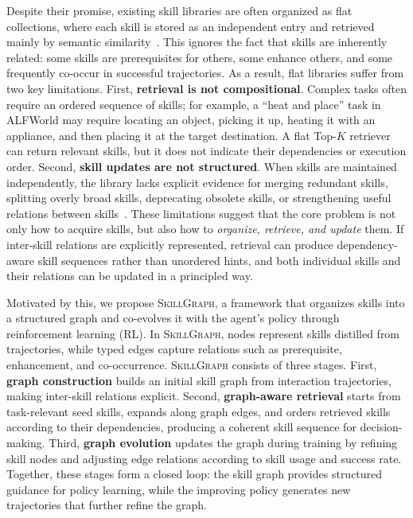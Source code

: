 Despite their promise, existing skill libraries are often organized as flat collections, where each skill is stored as an independent entry and retrieved mainly by semantic similarity~\citep{xia2025skillrl, zhao2024expel, liu2025simplemem}. 
This ignores the fact that skills are inherently related: some skills are prerequisites for others, some enhance others, and some frequently co-occur in successful trajectories. 
As a result, flat libraries suffer from two key limitations. 
First, \textbf{retrieval is not compositional}. 
Complex tasks often require an ordered sequence of skills; for example, a ``heat and place'' task in ALFWorld may require locating an object, picking it up, heating it with an appliance, and then placing it at the target destination. 
A flat Top-$K$ retriever can return relevant skills, but it does not indicate their dependencies or execution order. 
Second, \textbf{skill updates are not structured}. 
When skills are maintained independently, the library lacks explicit evidence for merging redundant skills, splitting overly broad skills, deprecating obsolete skills, or strengthening useful relations between skills~\citep{xu2026agent}.
These limitations suggest that the core problem is not only how to acquire skills, but also how to  \emph{organize, retrieve, and update} them. 
If inter-skill relations are explicitly represented, retrieval can produce dependency-aware skill sequences rather than unordered hints, and both individual skills and their relations can be updated in a principled way.

Motivated by this, we propose \textsc{SkillGraph}, a framework that organizes skills into a structured graph and co-evolves it with the agent's policy through reinforcement learning (RL). 
In \textsc{SkillGraph}, nodes represent skills distilled from trajectories, while typed edges capture relations such as prerequisite, enhancement, and co-occurrence. \textsc{SkillGraph} consists of three stages. 
First, \textbf{graph construction} builds an initial skill graph from interaction trajectories, making inter-skill relations explicit. 
Second, \textbf{graph-aware retrieval} starts from task-relevant seed skills, expands along graph edges, and orders retrieved skills according to their dependencies, producing a coherent skill sequence for decision-making. 
Third, \textbf{graph evolution} updates the graph during training by refining skill nodes and adjusting edge relations according to skill usage and success rate. 
Together, these stages form a closed loop: the skill graph provides structured guidance for policy learning, while the improving policy generates new trajectories that further refine the graph.


